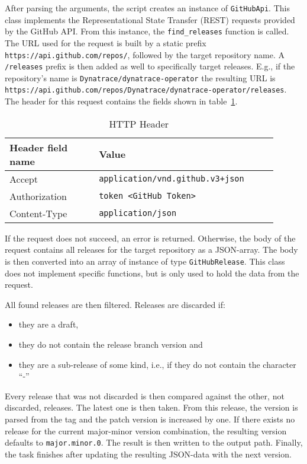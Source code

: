 \pagebreak

After parsing the arguments, the script creates an instance of \verb|GitHubApi|.
This class implements the Representational State Transfer (REST) requests provided by the GitHub API.
From this instance, the \verb|find_releases| function is called.
The URL used for the request is built by a static prefix \verb|https://api.github.com/repos/|, followed by the target repository name.
A \verb|/releases| prefix is then added as well to specifically target releases.
E.g., if the repository's name is \verb|Dynatrace/dynatrace-operator| the resulting URL is \verb|https://api.github.com/repos/Dynatrace/dynatrace-operator/releases|.
The header for this request contains the fields shown in table~\ref{tab:http-header}.

\begin{table}[H]
    \centering
    \caption{HTTP Header}
    \label{tab:http-header}
    \begin{tabular}{p{0.3\linewidth}|p{0.6\linewidth}}
        Header field name & Value \\
        \hline
        Accept & \verb|application/vnd.github.v3+json| \\
        Authorization & \verb|token <GitHub Token>| \\
        Content-Type & \verb|application/json| \\
    \end{tabular}
\end{table}

If the request does not succeed, an error is returned.
Otherwise, the body of the request contains all releases for the target repository as a JSON-array.
The body is then converted into an array of instance of type \verb|GitHubRelease|.
This class does not implement specific functions, but is only used to hold the data from the request.

All found releases are then filtered.
Releases are discarded if:
\begin{itemize}
    \item they are a draft,
    \item they do not contain the release branch version and
    \item they are a sub-release of some kind, i.e., if they do not contain the character ``-''
\end{itemize}

Every release that was not discarded is then compared against the other, not discarded, releases.
The latest one is then taken.
From this release, the version is parsed from the tag and the patch version is increased by one.
If there exists no release for the current major-minor version combination, the resulting version defaults to \verb|major.minor.0|.
The result is then written to the output path.
Finally, the task finishes after updating the resulting JSON-data with the next version.
